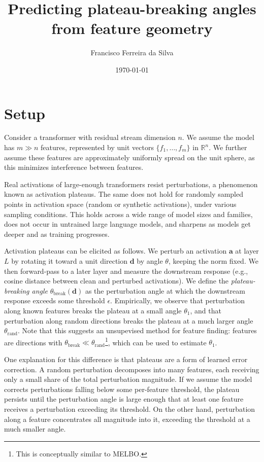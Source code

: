 \documentclass[11pt]{article}
\title{Predicting plateau-breaking angles from feature geometry}
\author{Francisco Ferreira da Silva}
\date{\today}
\begin{document}
\maketitle

\section{Setup}

Consider a transformer with residual stream dimension $n$.
We assume the model has $m \gg n$ features, represented by unit vectors $\{f_1, \ldots, f_m\}$ in $\mathbb{R}^n$.
We further assume these features are approximately uniformly spread on the unit sphere, as this minimizes interference between features.

Real activations of large-enough transformers resist perturbations, a phenomenon known as activation plateaus.
The same does not hold for randomly sampled points in activation space (random or synthetic activations), under various sampling conditions.
This holds across a wide range of model sizes and families, does not occur in untrained large language models, and sharpens as models get deeper and as training progresses.

Activation plateaus can be elicited as follows.
We perturb an activation $\mathbf{a}$ at layer $L$ by rotating it toward a unit direction $\mathbf{d}$ by angle $\theta$, keeping the norm fixed.
We then forward-pass to a later layer and measure the downstream response (e.g., cosine distance between clean and perturbed activations).
We define the \emph{plateau-breaking angle} $\theta_{\mathrm{break}}(\mathbf{d})$ as the perturbation angle at which the downstream response exceeds some threshold $\epsilon$.
Empirically, we observe that perturbation along known features breaks the plateau at a small angle $\theta_1$, and that perturbation along random directions breaks the plateau at a much larger angle $\theta_{\mathrm{rand}}$.
Note that this suggests an unsupevised method for feature finding: features are directions with $\theta_{\text{break}} \ll \theta_{\mathrm{rand}}$\footnote{This is conceptually similar to MELBO.}, which can be used to estimate $\theta_1$.

One explanation for this difference is that plateaus are a form of learned error correction.
A random perturbation decomposes into many features, each receiving only a small share of the total perturbation magnitude.
If we assume the model corrects perturbations falling below some per-feature threshold, the plateau persists until the perturbation angle is large enough that at least one feature receives a perturbation exceeding its threshold.
On the other hand, perturbation along a feature concentrates all magnitude into it, exceeding the threshold at a much smaller angle.
\end{document}
